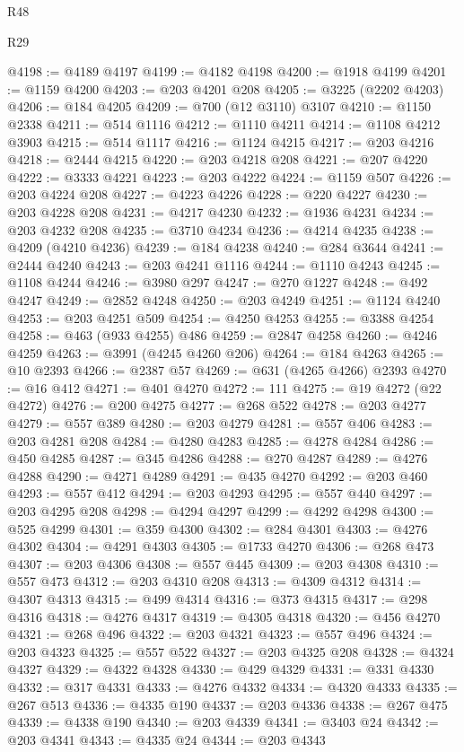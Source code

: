 \begin{lexlean}{R48}
\begin{lexlean}{R29}
\begin{coremodule}
{{{{{{{{{{{{{{{{{{{{{{{{{{{{{{{{{{{{{{{{{{{{{{{{{{{{{{{{{{{{{{{{{{{{{{{{{{{{{{{{{{{{{{{{{{{{{{{{{{{{{{{{{{{{{{{{{{{{{{{{{{{{{{{{{{{{{{{{{{{{{{{{{{{{{{{{{{{{{{{{{{{{{{{{{{{{{{{{{{{{{{{{{{{{{{{{{{{{{{{{{{{{{{{{{{{{{{{{{{@4198 := @4189 @4197
@4199 := @4182 @4198
@4200 := @1918 @4199
@4201 := @1159 @4200
@4203 := @203 @4201 @208
@4205 := @3225 (@2202 @4203)
@4206 := @184 @4205
@4209 := @700 (@12 @3110) @3107
@4210 := @1150 @2338
@4211 := @514 @1116
@4212 := @1110 @4211
@4214 := @1108 @4212 @3903
@4215 := @514 @1117
@4216 := @1124 @4215
@4217 := @203 @4216
@4218 := @2444 @4215
@4220 := @203 @4218 @208
@4221 := @207 @4220
@4222 := @3333 @4221
@4223 := @203 @4222
@4224 := @1159 @507
@4226 := @203 @4224 @208
@4227 := @4223 @4226
@4228 := @220 @4227
@4230 := @203 @4228 @208
@4231 := @4217 @4230
@4232 := @1936 @4231
@4234 := @203 @4232 @208
@4235 := @3710 @4234
@4236 := @4214 @4235
@4238 := @4209 (@4210 @4236)
@4239 := @184 @4238
@4240 := @284 @3644
@4241 := @2444 @4240
@4243 := @203 @4241 @1116
@4244 := @1110 @4243
@4245 := @1108 @4244
@4246 := @3980 @297
@4247 := @270 @1227
@4248 := @492 @4247
@4249 := @2852 @4248
@4250 := @203 @4249
@4251 := @1124 @4240
@4253 := @203 @4251 @509
@4254 := @4250 @4253
@4255 := @3388 @4254
@4258 := @463 (@933 @4255) @486
@4259 := @2847 @4258
@4260 := @4246 @4259
@4263 := @3991 (@4245 @4260 @206)
@4264 := @184 @4263
@4265 := @10 @2393
@4266 := @2387 @57
@4269 := @631 (@4265 @4266) @2393
@4270 := @16 @412
@4271 := @401 @4270
@4272 := 111
@4275 := @19 @4272 (@22 @4272)
@4276 := @200 @4275
@4277 := @268 @522
@4278 := @203 @4277
@4279 := @557 @389
@4280 := @203 @4279
@4281 := @557 @406
@4283 := @203 @4281 @208
@4284 := @4280 @4283
@4285 := @4278 @4284
@4286 := @450 @4285
@4287 := @345 @4286
@4288 := @270 @4287
@4289 := @4276 @4288
@4290 := @4271 @4289
@4291 := @435 @4270
@4292 := @203 @460
@4293 := @557 @412
@4294 := @203 @4293
@4295 := @557 @440
@4297 := @203 @4295 @208
@4298 := @4294 @4297
@4299 := @4292 @4298
@4300 := @525 @4299
@4301 := @359 @4300
@4302 := @284 @4301
@4303 := @4276 @4302
@4304 := @4291 @4303
@4305 := @1733 @4270
@4306 := @268 @473
@4307 := @203 @4306
@4308 := @557 @445
@4309 := @203 @4308
@4310 := @557 @473
@4312 := @203 @4310 @208
@4313 := @4309 @4312
@4314 := @4307 @4313
@4315 := @499 @4314
@4316 := @373 @4315
@4317 := @298 @4316
@4318 := @4276 @4317
@4319 := @4305 @4318
@4320 := @456 @4270
@4321 := @268 @496
@4322 := @203 @4321
@4323 := @557 @496
@4324 := @203 @4323
@4325 := @557 @522
@4327 := @203 @4325 @208
@4328 := @4324 @4327
@4329 := @4322 @4328
@4330 := @429 @4329
@4331 := @331 @4330
@4332 := @317 @4331
@4333 := @4276 @4332
@4334 := @4320 @4333
@4335 := @267 @513
@4336 := @4335 @190
@4337 := @203 @4336
@4338 := @267 @475
@4339 := @4338 @190
@4340 := @203 @4339
@4341 := @3403 @24
@4342 := @203 @4341
@4343 := @4335 @24
@4344 := @203 @4343
}}}}}}}}}}}}}}}}}}}}}}}}}}}}}}}}}}}}}}}}}}}}}}}}}}}}}}}}}}}}}}}}}}}}}}}}}}}}}}}}}}}}}}}}}}}}}}}}}}}}}}}}}}}}}}}}}}}}}}}}}}}}}}}}}}}}}}}}}}}}}}}}}}}}}}}}}}}}}}}}}}}}}}}}}}}}}}}}}}}}}}}}}}}}}}}}}}}}}}}}}}}}}}}}}}}}}}}}}}
\end{coremodule}
\end{lexlean}
\end{lexlean}

